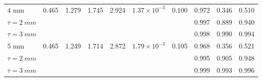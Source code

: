 \documentclass{article}
\begin{document}
\begin{table}[h]
{\begin{tabular}{lccccccccc}
\midrule
4 mm & 0.465 & 1.279 & 1.745 & 2.924 & $1.37 \times 10^{-3}$ & 0.100 & 0.972 & 0.346 & 0.510 \\
  \textit{$\tau = \SI{2}{mm}$} & & & & & & & 0.997 & 0.889 & 0.940 \\
  \textit{$\tau = \SI{3}{mm}$} & & & & & & & 0.998 & 0.990 & 0.994 \\
\midrule
5 mm & 0.465 & 1.249 & 1.714 & 2.872 & $1.79 \times 10^{-3}$ & 0.105 & 0.968 & 0.356 & 0.521 \\
  \textit{$\tau = \SI{2}{mm}$} & & & & & & & 0.995 & 0.905 & 0.948 \\
  \textit{$\tau = \SI{3}{mm}$} & & & & & & & 0.999 & 0.993 & 0.996 \\
\bottomrule
\end{tabular}%
}
\end{table}
\end{document}
